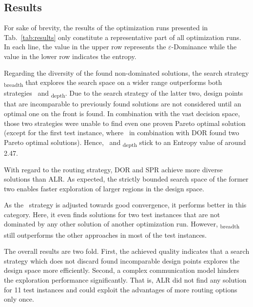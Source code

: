 \subsection{Results}
For sake of brevity, the results of the optimization runs presented in Tab.~\ref{tab:results} only constitute a representative part of all optimization runs. In each line, the value in the upper row represents the \mbox{$\varepsilon$-Dominance} while the value in the lower row indicates the entropy.\par
Regarding the diversity of the found non-dominated solutions, the search strategy \theory\textsubscript{breadth} that explores the search space on a wider range outperforms both strategies \hybrid\ and \theory\textsubscript{depth}. Due to the search strategy of the latter two, design points that are incomparable to previously found solutions are not considered until an optimal one on the front is found. In combination with the vast decision space, those two strategies were unable to find even one proven Pareto optimal solution (except for the first test instance, where \hybrid\ in combination with DOR found two Pareto optimal solutions). Hence, \hybrid\ and \theory\textsubscript{depth} stick to an Entropy value of around 2.47. \par
With regard to the routing strategy, DOR and SPR achieve more diverse solutions than ALR. As expected, the strictly bounded search space of the former two enables faster exploration of larger regions in the design space.  \par
As the \hybrid\ strategy is adjusted towards good convergence, it performs better in this category. Here, it even finds solutions for two test instances that are not dominated by any other solution of another optimization run. However, \theory\textsubscript{breadth} still outperforms the other approaches in most of the test instances. \par 
The overall results are two fold. First, the achieved quality indicates that a search strategy which does not discard found incomparable design points explores the design space more efficiently. Second, a complex communication model hinders the exploration performance significantly. That is, ALR did not find any solution for 11 test instances and could exploit the advantages of more routing options only once.\par



